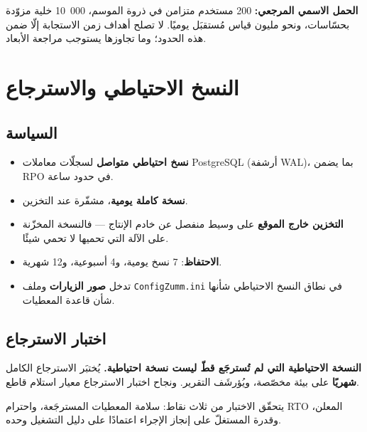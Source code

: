 \begin{encadre}
\textbf{الحمل الاسمي المرجعي:} 200 مستخدم متزامن في ذروة الموسم، 10~000 خلية
مزوّدة بحسّاسات، ونحو مليون قياس مُستقبَل يوميًا. لا تصلح أهداف زمن الاستجابة
إلّا ضمن هذه الحدود؛ وما تجاوزها يستوجب مراجعة الأبعاد.
\end{encadre}

\section{النسخ الاحتياطي والاسترجاع}
\subsection{السياسة}
\begin{itemize}
  \item \textbf{نسخ احتياطي متواصل} لسجلّات معاملات PostgreSQL (أرشفة WAL)، بما
        يضمن RPO في حدود ساعة.
  \item \textbf{نسخة كاملة يومية}، مشفّرة عند التخزين.
  \item \textbf{التخزين خارج الموقع} على وسيط منفصل عن خادم الإنتاج --- فالنسخة
        المخزّنة على الآلة التي تحميها لا تحمي شيئًا.
  \item \textbf{الاحتفاظ}: 7 نسخ يومية، و4 أسبوعية، و12 شهرية.
  \item تدخل \textbf{صور الزيارات} وملف \texttt{ConfigZumm.ini} في نطاق النسخ
        الاحتياطي شأنها شأن قاعدة المعطيات.
\end{itemize}

\subsection{اختبار الاسترجاع}
\begin{encadre}
\textbf{النسخة الاحتياطية التي لم تُسترجَع قطّ ليست نسخة احتياطية.} يُختبَر
الاسترجاع الكامل \textbf{شهريًا} على بيئة مخصّصة، ويُؤرشَف التقرير. ونجاح اختبار
الاسترجاع معيار استلام قاطع.
\end{encadre}

يتحقّق الاختبار من ثلاث نقاط: سلامة المعطيات المسترجَعة، واحترام RTO المعلن،
وقدرة المستغلّ على إنجاز الإجراء اعتمادًا على دليل التشغيل وحده.

